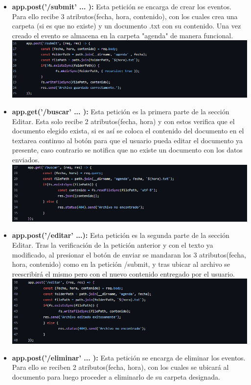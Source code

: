 \documentclass{article}
\begin{document}
\begin{itemize}
    \item \textbf{app.post('/submit' ... ): } Esta petición se encarga de crear los eventos. Para ello recibe 3 atributos(fecha, hora, contenido), con los cuales crea una carpeta (si es que no existe) y un documento .txt con su contenido. Una vez creado el evento se almacena en la carpeta "agenda" de manera funcional.\\



\includegraphics[width=\textwidth]{img/2.png}
\item \textbf{app.get('/buscar' ... ): } Esta petición es la primera parte de la sección Editar. Esta solo recibe 2 atributos(fecha, hora) y con estos verifica que el documento elegido exista, si es así se coloca el contenido del documento en el textarea continuo al botón para que el usuario pueda editar el documento ya presente, caso contrario se notifica que no existe un documento con los datos enviados.\\



\includegraphics[width=\textwidth]{img/3.png}
\item \textbf{app.post('/editar' ...): } Esta petición es la segunda parte de la sección Editar. Tras la verificación de la petición anterior y con el texto ya modificado, al presionar el botón de enviar se mandaran los 3 atributos(fecha, hora, contenido) como en la petición /submit, y tras ubicar al archivo se reescribirá el mismo pero con el nuevo contenido entregado por el usuario.\\



\includegraphics[width=\textwidth]{img/4.png}
\item \textbf{app.post('/eliminar' ... ): } Esta petición se encarga de eliminar los eventos. Para ello se reciben 2 atributos(fecha, hora), con los cuales se ubicará al documento para luego proceder a eliminarlo de su carpeta designada. \\




\end{itemize}
\end{document}
